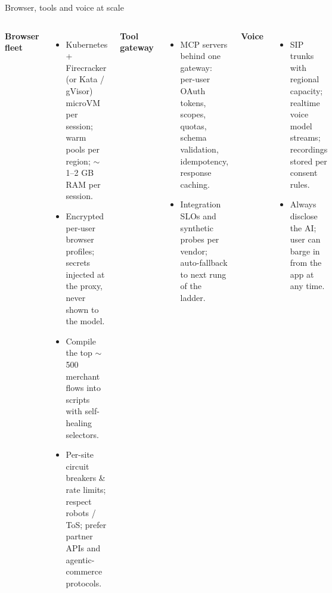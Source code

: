 \documentclass[aspectratio=169,10pt]{beamer}
\begin{document}
\begin{frame}{Browser, tools and voice at scale}
\begin{columns}[T]
\small
\textbf{Browser fleet}
\begin{itemize}
  \item Kubernetes + Firecracker (or Kata / gVisor) microVM per session; warm pools per region; $\sim$1--2 GB RAM per session.
  \item Encrypted per-user browser profiles; secrets injected at the proxy, never shown to the model.
  \item Compile the top $\sim$500 merchant flows into scripts with self-healing selectors.
  \item Per-site circuit breakers \& rate limits; respect robots / ToS; prefer partner APIs and agentic-commerce protocols.
\end{itemize}
\small
\textbf{Tool gateway}
\begin{itemize}
  \item MCP servers behind one gateway: per-user OAuth tokens, scopes, quotas, schema validation, idempotency, response caching.
  \item Integration SLOs and synthetic probes per vendor; auto-fallback to next rung of the ladder.
\end{itemize}
\textbf{Voice}
\begin{itemize}
  \item SIP trunks with regional capacity; realtime voice model streams; recordings stored per consent rules.
  \item Always disclose the AI; user can barge in from the app at any time.
\end{itemize}
\end{columns}
\end{frame}
\end{document}
